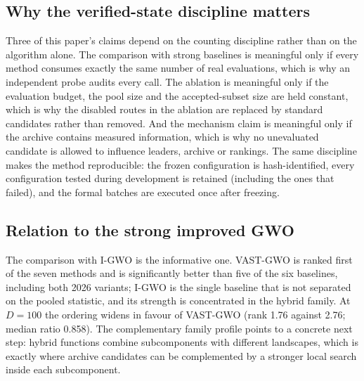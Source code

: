 \documentclass[11pt,a4paper]{article}
\newcommand{\method}{VAST-GWO}
\begin{document}
\subsection{Why the verified-state discipline matters}
Three of this paper's claims depend on the counting discipline rather than on
the algorithm alone. The comparison with strong baselines is meaningful only
if every method consumes exactly the same number of real evaluations, which is
why an independent probe audits every call. The ablation is meaningful only if
the evaluation budget, the pool size and the accepted-subset size are held
constant, which is why the disabled routes in the ablation are replaced by
standard candidates rather than removed. And the mechanism claim is meaningful
only if the archive contains measured information, which is why no unevaluated
candidate is allowed to influence leaders, archive or rankings. The same
discipline makes the method reproducible: the frozen configuration is
hash-identified, every configuration tested during development is retained
(including the ones that failed), and the formal batches are executed once
after freezing.

\subsection{Relation to the strong improved GWO}
The comparison with I-GWO is the informative one. \method{} is ranked first of
the seven methods and is significantly better than five of the six baselines,
including both 2026 variants; I-GWO is the single baseline that is not
separated on the pooled statistic, and its strength is concentrated in the
hybrid family. At $D=100$ the ordering widens in favour of \method{} (rank 1.76
against 2.76; median ratio 0.858). The complementary family profile points to
a concrete next step: hybrid functions combine subcomponents with different
landscapes, which is exactly where archive candidates can be complemented by a
stronger local search inside each subcomponent.
\end{document}
